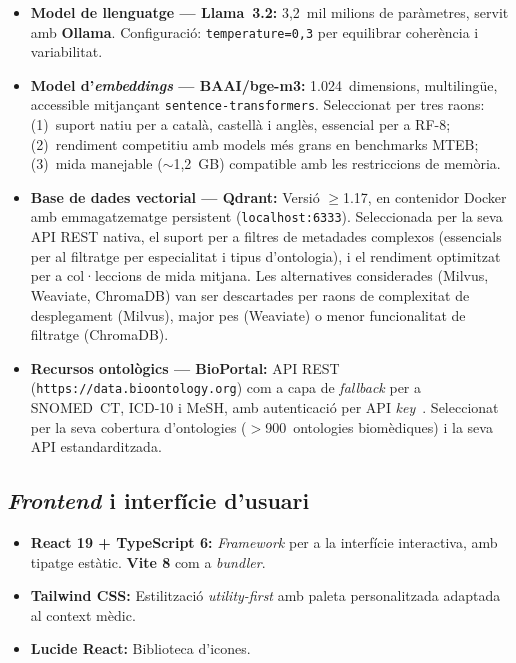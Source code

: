 \documentclass[CAT]{TFUOC}%
\begin{document}
\begin{itemize}
    \item \textbf{Model de llenguatge --- Llama~3.2:} 3,2~mil milions de paràmetres, servit amb \textbf{Ollama}. Configuració: \texttt{temperature=0,3} per equilibrar coherència i variabilitat.

    \item \textbf{Model d'\textit{embeddings} --- BAAI/bge-m3:} 1.024~dimensions, multilingüe, accessible mitjançant \texttt{sentence-transformers}. Seleccionat per tres raons: (1)~suport natiu per a català, castellà i anglès, essencial per a RF-8; (2)~rendiment competitiu amb models més grans en benchmarks MTEB; (3)~mida manejable ($\sim$1,2~GB) compatible amb les restriccions de memòria.

    \item \textbf{Base de dades vectorial --- Qdrant:} Versió $\geq$1.17, en contenidor Docker amb emmagatzematge persistent (\texttt{localhost:6333}). Seleccionada per la seva API REST nativa, el suport per a filtres de metadades complexos (essencials per al filtratge per especialitat i tipus d'ontologia), i el rendiment optimitzat per a col·leccions de mida mitjana. Les alternatives considerades (Milvus, Weaviate, ChromaDB) van ser descartades per raons de complexitat de desplegament (Milvus), major pes (Weaviate) o menor funcionalitat de filtratge (ChromaDB).

    \item \textbf{Recursos ontològics --- BioPortal:} API REST (\texttt{https://data.bioontology.org}) com a capa de \textit{fallback} per a SNOMED~CT, ICD-10 i MeSH, amb autenticació per API \textit{key}~\cite{vendetti2025bioportal}. Seleccionat per la seva cobertura d'ontologies ($>$900~ontologies biomèdiques) i la seva API estandarditzada.
\end{itemize}

\subsection{\textit{Frontend} i interfície d'usuari}

\begin{itemize}
    \item \textbf{React 19 + TypeScript 6:} \textit{Framework} per a la interfície interactiva, amb tipatge estàtic. \textbf{Vite 8} com a \textit{bundler}.

    \item \textbf{Tailwind CSS:} Estilització \textit{utility-first} amb paleta personalitzada adaptada al context mèdic.

    \item \textbf{Lucide React:} Biblioteca d'icones.
\end{itemize}
\end{document}
